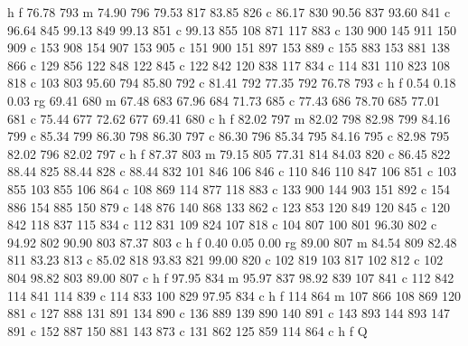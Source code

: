 {{   h f
   76.78 793 m
   74.90 796 79.53 817 83.85 826 c
   86.17 830 90.56 837 93.60 841 c
   96.64 845 99.13 849 99.13 851 c
   99.13 855 108 871 117 883 c
   130 900 145 911 150 909 c
   153 908 154 907 153 905 c
   151 900 151 897 153 889 c
   155 883 153 881 138 866 c
   129 856 122 848 122 845 c
   122 842 120 838 117 834 c
   114 831 110 823 108 818 c
   103 803 95.60 794 85.80 792 c
   81.41 792 77.35 792 76.78 793 c
   h f
   0.54 0.18 0.03 rg
   69.41 680 m
   67.48 683 67.96 684 71.73 685 c
   77.43 686 78.70 685 77.01 681 c
   75.44 677 72.62 677 69.41 680 c
   h f
   82.02 797 m
   82.02 798 82.98 799 84.16 799 c
   85.34 799 86.30 798 86.30 797 c
   86.30 796 85.34 795 84.16 795 c
   82.98 795 82.02 796 82.02 797 c
   h f
   87.37 803 m
   79.15 805 77.31 814 84.03 820 c
   86.45 822 88.44 825 88.44 828 c
   88.44 832 101 846 106 846 c
   110 846 110 847 106 851 c
   103 855 103 855 106 864 c
   108 869 114 877 118 883 c
   133 900 144 903 151 892 c
   154 886 154 885 150 879 c
   148 876 140 868 133 862 c
   123 853 120 849 120 845 c
   120 842 118 837 115 834 c
   112 831 109 824 107 818 c
   104 807 100 801 96.30 802 c
   94.92 802 90.90 803 87.37 803 c
   h f
   0.40 0.05 0.00 rg
   89.00 807 m
   84.54 809 82.48 811 83.23 813 c
   85.02 818 93.83 821 99.00 820 c
   102 819 103 817 102 812 c
   102 804 98.82 803 89.00 807 c
   h f
   97.95 834 m
   95.97 837 98.92 839 107 841 c
   112 842 114 841 114 839 c
   114 833 100 829 97.95 834 c
   h f
   114 864 m
   107 866 108 869 120 881 c
   127 888 131 891 134 890 c
   136 889 139 890 140 891 c
   143 893 144 893 147 891 c
   152 887 150 881 143 873 c
   131 862 125 859 114 864 c
   h f
   Q
}}

